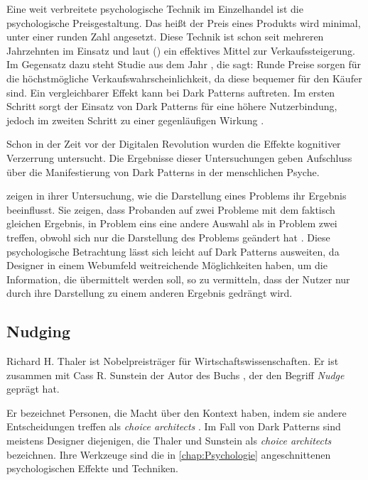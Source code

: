 \documentclass[conference,compsoc,final,a4paper]{IEEEtran}
\begin{document}
Eine weit verbreitete psychologische Technik im Einzelhandel ist die psychologische Preisgestaltung. Das heißt der Preis eines Produkts wird minimal, unter einer runden Zahl angesetzt. Diese Technik ist schon seit mehreren Jahrzehnten im Einsatz und laut \citeauthor{Bizer_2005} () \autocite{Bizer_2005} ein effektives Mittel zur Verkaufssteigerung. Im Gegensatz dazu steht \citeauthor{Wieseke_2015} \autocite{Wieseke_2015} Studie aus dem Jahr , die sagt: Runde Preise sorgen für die höchstmögliche Verkaufswahrscheinlichkeit, da diese bequemer für den Käufer sind. Ein vergleichbarer Effekt kann bei Dark Patterns auftreten. Im ersten Schritt sorgt der Einsatz von Dark Patterns für eine höhere Nutzerbindung, jedoch im zweiten Schritt zu einer gegenläufigen Wirkung \autocite{M.Bhoot2020}.

Schon in der Zeit vor der Digitalen Revolution wurden die Effekte kognitiver Verzerrung untersucht. Die Ergebnisse dieser Untersuchungen geben Aufschluss über die Manifestierung von Dark Patterns in der menschlichen Psyche.

\citeauthor{Tversky453} zeigen in ihrer Untersuchung, wie die Darstellung eines Problems ihr Ergebnis beeinflusst. Sie zeigen, dass Probanden auf zwei Probleme mit dem faktisch gleichen Ergebnis, in Problem eins eine andere Auswahl als in Problem zwei treffen, obwohl sich nur die Darstellung des Problems geändert hat \autocite{Tversky453}. Diese psychologische Betrachtung lässt sich leicht auf Dark Patterns ausweiten, da Designer in einem Webumfeld weitreichende Möglichkeiten haben, um die Information, die übermittelt werden soll, so zu vermitteln, dass der Nutzer nur durch ihre Darstellung zu einem anderen Ergebnis gedrängt wird.
\subsection{Nudging}
Richard H. Thaler ist Nobelpreisträger für Wirtschaftswissenschaften. Er ist zusammen mit Cass R. Sunstein der Autor des Buchs , der den Begriff \textit{Nudge} geprägt hat.

Er bezeichnet Personen, die Macht über den Kontext haben, indem sie andere Entscheidungen treffen als \textit{choice architects} \autocite[S. 3]{Thaler2008}. Im Fall von Dark Patterns sind meistens Designer diejenigen, die Thaler und Sunstein als \textit{choice architects} bezeichnen. Ihre Werkzeuge sind die in \autoref{chap:Psychologie} angeschnittenen psychologischen Effekte und Techniken.
\end{document}
